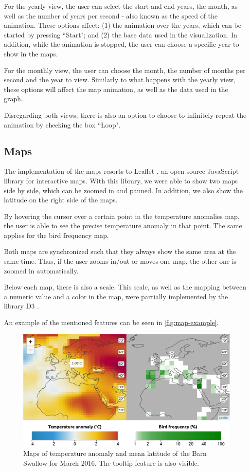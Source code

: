 \documentclass[journal]{vgtc}                %
\begin{document}
For the yearly view, the user can select the start and end years, the month, as well as the number of years per second - also known as the speed of the animation. These options affect: (1) the animation over the years, which can be started by pressing ``Start"; and (2) the base data used in the visualization. In addition, while the animation is stopped, the user can choose a specific year to show in the maps.

For the monthly view, the user can choose the month, the number of months per second and the year to view. Similarly to what happens with the yearly view, these options will affect the map animation, as well as the data used in the graph.

Disregarding both views, there is also an option to choose to infinitely repeat the animation by checking the box ``Loop".

\subsection{Maps}

The implementation of the maps resorts to Leaflet \cite{leaflet}, an open-source JavaScript library for interactive maps. With this library, we were able to show two maps side by side, which can be zoomed in and panned. In addition, we also show the latitude on the right side of the maps.

By hovering the cursor over a certain point in the temperature anomalies map, the user is able to see the precise temperature anomaly in that point. The same applies for the bird frequency map.

Both maps are synchronized such that they always show the same area at the same time. Thus, if the user zooms in/out or moves one map, the other one is zoomed in automatically.

Below each map, there is also a scale. This scale, as well as the mapping between a numeric value and a color in the map, were partially implemented by the library D3 \cite{d3js}.

An example of the mentioned features can be seen in \autoref{fig:map-example}.

\begin{figure}[t]
  \centering
  \includegraphics[width=\linewidth]{map-example}
  \caption{Maps of temperature anomaly and mean latitude of the Barn Swallow for March 2016. The tooltip feature is also visible.}
  \label{fig:map-example}
\end{figure}
\end{document}
